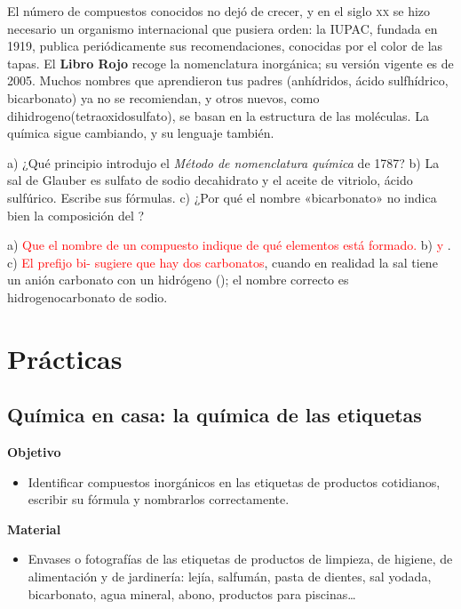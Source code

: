 El número de compuestos conocidos no dejó de crecer, y en el siglo \textsc{xx} se hizo necesario un organismo internacional que
pusiera orden: la IUPAC, fundada en 1919, publica periódicamente sus recomendaciones, conocidas por el color de las tapas. El
\textbf{Libro Rojo} recoge la nomenclatura inorgánica; su versión vigente es de 2005. Muchos nombres que aprendieron tus padres
(anhídridos, ácido sulfhídrico, bicarbonato) ya no se recomiendan, y otros nuevos, como dihidrogeno(tetraoxidosulfato), se
basan en la estructura de las moléculas. La química sigue cambiando, y su lenguaje también.

\begin{exercise}
    a) ¿Qué principio introdujo el \textit{Método de nomenclatura química} de 1787? b) La sal de Glauber es sulfato de sodio
    decahidrato y el aceite de vitriolo, ácido sulfúrico. Escribe sus fórmulas. c) ¿Por qué el nombre «bicarbonato» no indica
    bien la composición del ?
    \begin{solu}
        a) \textcolor{red}{Que el nombre de un compuesto indique de qué elementos está formado.} b) \textcolor{red}{ y }. c) \textcolor{red}{El prefijo bi- sugiere que hay dos carbonatos}, cuando en realidad la sal tiene
        un anión carbonato con un hidrógeno (); el nombre correcto es hidrogenocarbonato de sodio.
    \end{solu}
\end{exercise}

\section{Prácticas}\label{sec:ud5-practicas}

\subsection{Química en casa: la química de las etiquetas}

\noindent\begin{minipage}[t]{0.48\textwidth}
    \textbf{Objetivo}
    \begin{itemize}
        \item Identificar compuestos inorgánicos en las etiquetas de productos cotidianos, escribir su fórmula y nombrarlos
        correctamente.
    \end{itemize}
\end{minipage}\hfill
\begin{minipage}[t]{0.48\textwidth}
    \textbf{Material}
    \begin{itemize}
        \item Envases o fotografías de las etiquetas de productos de limpieza, de higiene, de alimentación y de jardinería:
        lejía, salfumán, pasta de dientes, sal yodada, bicarbonato, agua mineral, abono, productos para piscinas\dots
    \end{itemize}
\end{minipage}

